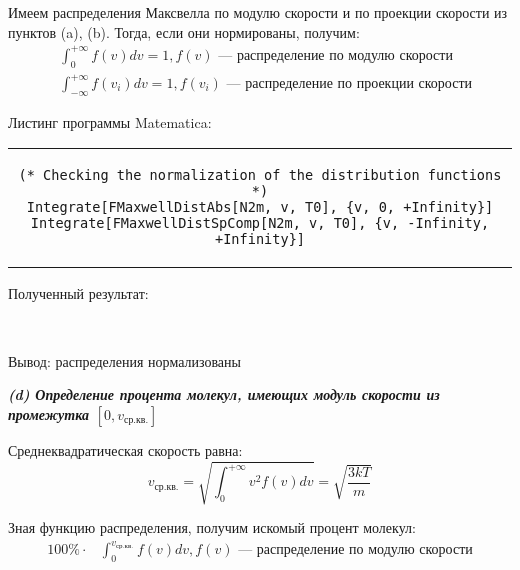 Имеем распределения Максвелла по модулю скорости и по проекции скорости из пунктов (a), (b). Тогда, если они нормированы, получим:
\begin{equation*}
    \begin{aligned}
        &\int_{0}^{+\infty} f(v)dv=1, f(v) \text{ --- распределение по модулю скорости}\\
        &\int_{-\infty}^{+\infty} f(v_{i})dv=1, f(v_{i}) \text{ --- распределение по проекции скорости}
    \end{aligned}
\end{equation*}


Листинг программы Matematica:
\begin{center}
    \begin{tabular}{c}
    \begin{lstlisting}
(* Checking the normalization of the distribution functions *)
Integrate[FMaxwellDistAbs[N2m, v, T0], {v, 0, +Infinity}]
Integrate[FMaxwellDistSpComp[N2m, v, T0], {v, -Infinity, +Infinity}]
    \end{lstlisting}
    \end{tabular}
\end{center}

Полученный результат:
\hspace{0pt}
\begin{figure}[H]
    \centering
    \begin{minipage}[h]{0.15\linewidth}
        \\
    \end{minipage}
\end{figure}

Вывод: распределения нормализованы


\newpage
\textit{\textbf{(d) Определение процента молекул, имеющих модуль скорости из промежутка $[0, v_{\text{ср.кв.}}]$}}

Среднеквадратическая скорость равна:
\begin{equation*}
    v_{\text{ср.кв.}}=\sqrt{\int_{0}^{+\infty} v^{2}f(v)dv} = \sqrt{\frac{3kT}{m}}
\end{equation*}

Зная функцию распределения, получим искомый процент молекул:
\begin{equation*}
    \begin{aligned}
        100\% \cdot &\int_{0}^{v_{\text{ср.кв.}}} f(v)dv, f(v) \text{ --- распределение по модулю скорости}\\
    \end{aligned}
\end{equation*}

